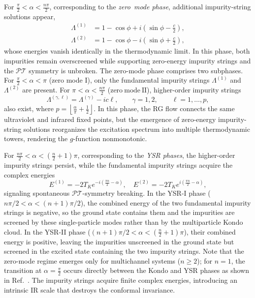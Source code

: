 \documentclass[aps,  prb,twocolumn,
  superscriptaddress,  floatfix,  10pt         
]{revtex4-2}
\begin{document}
For $\frac{\pi}{2}<\alpha<\frac{n\pi}{2}$, corresponding to the {\em{zero\ mode phase}}, additional impurity-string solutions appear,
\begin{align}
\Lambda^{(1)}
&=
1-\cos\phi
+i\left(\sin\phi-\frac{c}{2}\right),\\
\Lambda^{(2)}
&=
1-\cos\phi
-i\left(\sin\phi+\frac{c}{2}\right),
\end{align}
whose energies vanish identically in the thermodynamic limit. In this phase, both impurities remain overscreened while supporting zero-energy impurity strings and the $\mathscr{PT}$ symmetry is unbroken. The zero-mode phase comprises two subphases. For $\frac{\pi}{2}<\alpha<\pi$ (zero mode I), only the fundamental impurity strings $\Lambda^{(1)}$ and $\Lambda^{(2)}$ are present. For $\pi<\alpha<\frac{n\pi}{2}$ ($\mathrm{zero\ mode\ II}$), higher-order impurity strings
\begin{equation}
\Lambda^{(\gamma,\ell)}
=
\Lambda^{(\gamma)}
-
ic\ell,
\qquad
\gamma=1,2,
\qquad
\ell=1,\ldots,p,
\end{equation}
also exist, where $p=\left\lfloor\frac{\alpha}{\pi}+\frac{1}{2}\right\rfloor$. In this phase, the RG flow connects the same ultraviolet and infrared fixed points, but the emergence of zero-energy impurity-string solutions reorganizes the excitation spectrum into multiple thermodynamic towers, rendering the $g$-function nonmonotonic.


For $\frac{n\pi}{2}<\alpha<\left(\frac{n}{2}+1\right)\pi$, corresponding to the {\em{YSR phases}}, the higher-order impurity strings persist, while the fundamental impurity strings acquire the complex energies
\begin{equation}
E^{(1)}
=
-2T_K e^{-i \left(\frac{\pi  n}{2}-\alpha \right)},
\quad
E^{(2)}
=
-2T_K e^{i \left(\frac{\pi  n}{2}-\alpha \right)},
\end{equation}
signaling spontaneous $\mathscr{PT}$-symmetry breaking. In the YSR-I phase ($n\pi/2<\alpha<(n+1)\pi/2$), the combined energy of the two fundamental impurity strings is negative, so the ground state contains them and the impurities are screened by these single-particle modes rather than by the multiparticle Kondo cloud. In the YSR-II phase ($ (n+1)\pi/2<\alpha<(\tfrac{n}{2}+1)\pi $), their combined energy is positive, leaving the impurities unscreened in the ground state but screened in the excited state containing the two impurity strings. Note that the zero-mode regime emerges only for multichannel systems ($n\ge2$); for $n=1$, the transition at $\alpha=\frac{\pi}{2}$ occurs directly between the Kondo and YSR phases as shown in Ref.~\cite{kattel2025dissipation,kattel2026monotonic}. The impurity strings acquire finite complex energies, introducing an intrinsic IR scale that destroys the conformal invariance.
\end{document}
